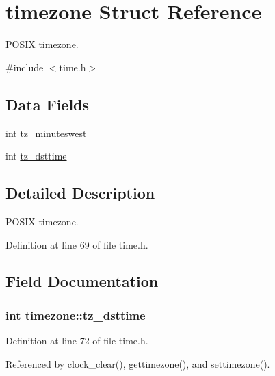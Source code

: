 \hypertarget{structtimezone}{}\section{timezone Struct Reference}
\label{structtimezone}


P\+O\+S\+IX timezone.  




{\ttfamily \#include $<$time.\+h$>$}

\subsection*{Data Fields}
\begin{DoxyCompactItemize}
\item 
int \hyperlink{structtimezone_a3042f7eff6e1b980728def76b1fa0eb7}{tz\+\_\+minuteswest}
\item 
int \hyperlink{structtimezone_a85259977aeb63b17e6ce94f19afdfd99}{tz\+\_\+dsttime}
\end{DoxyCompactItemize}


\subsection{Detailed Description}
P\+O\+S\+IX timezone. 

Definition at line 69 of file time.\+h.



\subsection{Field Documentation}
\subsubsection[{\texorpdfstring{tz\+\_\+dsttime}{tz_dsttime}}]{\setlength{\rightskip}{0pt plus 5cm}int timezone\+::tz\+\_\+dsttime}\hypertarget{structtimezone_a85259977aeb63b17e6ce94f19afdfd99}{}\label{structtimezone_a85259977aeb63b17e6ce94f19afdfd99}


Definition at line 72 of file time.\+h.



Referenced by clock\+\_\+clear(), gettimezone(), and settimezone().

